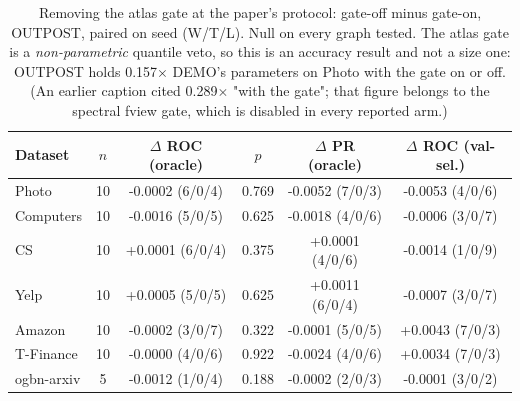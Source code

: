 \begin{table}[t]
\centering
\small
\begin{tabular}{lccccc}
\toprule
Dataset & $n$ & $\Delta$ ROC (oracle) & $p$ & $\Delta$ PR (oracle) & $\Delta$ ROC (val-sel.) \\
\midrule
Photo & 10 & -0.0002 (6/0/4) & 0.769 & -0.0052 (7/0/3) & -0.0053 (4/0/6) \\
Computers & 10 & -0.0016 (5/0/5) & 0.625 & -0.0018 (4/0/6) & -0.0006 (3/0/7) \\
CS & 10 & +0.0001 (6/0/4) & 0.375 & +0.0001 (4/0/6) & -0.0014 (1/0/9) \\
Yelp & 10 & +0.0005 (5/0/5) & 0.625 & +0.0011 (6/0/4) & -0.0007 (3/0/7) \\
Amazon & 10 & -0.0002 (3/0/7) & 0.322 & -0.0001 (5/0/5) & +0.0043 (7/0/3) \\
T-Finance & 10 & -0.0000 (4/0/6) & 0.922 & -0.0024 (4/0/6) & +0.0034 (7/0/3) \\
ogbn-arxiv & 5 & -0.0012 (1/0/4) & 0.188 & -0.0002 (2/0/3) & -0.0001 (3/0/2) \\
\bottomrule
\end{tabular}
\caption{Removing the atlas gate at the paper's protocol: gate-off minus gate-on, OUTPOST, paired on seed (W/T/L). Null on every graph tested. The atlas gate is a \emph{non-parametric} quantile veto, so this is an accuracy result and not a size one: OUTPOST holds 0.157$\times$ DEMO's parameters on Photo with the gate on or off. (An earlier caption cited 0.289$\times$ "with the gate"; that figure belongs to the spectral fview gate, which is disabled in every reported arm.)}
\label{tab:gate_off}
\end{table}
